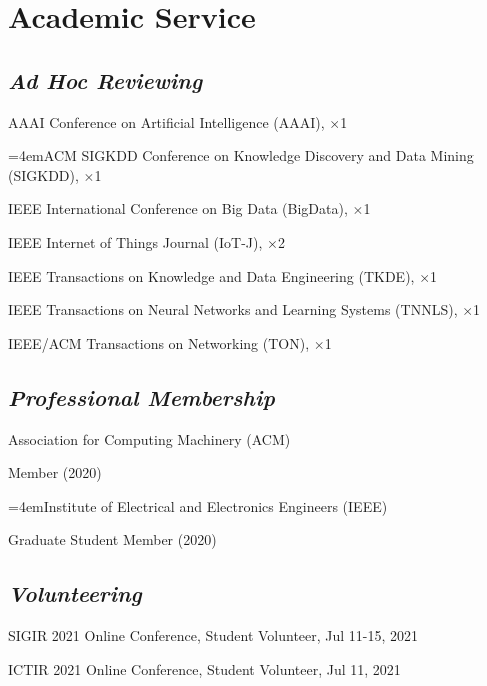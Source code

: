 
\vspace{-8pt}
\section*{Academic Service}
\vspace{-4pt}


\subsection*{\textnormal{\textit{Ad Hoc Reviewing}}}
\vspace{-4pt}
\indent

AAAI Conference on Artificial Intelligence (AAAI), $\times$1

\hangindent=4emACM SIGKDD Conference on Knowledge Discovery and Data Mining (SIGKDD), $\times$1


IEEE International Conference on Big Data (BigData), $\times$1

IEEE Internet of Things Journal (IoT-J), $\times$2

IEEE Transactions on Knowledge and Data Engineering (TKDE), $\times$1

IEEE Transactions on Neural Networks and Learning Systems (TNNLS), $\times$1

IEEE/ACM Transactions on Networking (TON), $\times$1

\subsection*{\textnormal{\textit{Professional Membership}}}
\vspace{-4pt}
\indent 

Association for Computing Machinery (ACM)  

\hspace{2em}Member (2020)

\hangindent=4emInstitute of Electrical and Electronics Engineers (IEEE)

\hspace{2em}Graduate Student Member (2020)



\subsection*{\textnormal{\textit{Volunteering}}}
\vspace{-4pt}
\indent 

SIGIR 2021 Online Conference, Student Volunteer, Jul 11-15, 2021

ICTIR 2021 Online Conference, Student Volunteer, Jul 11, 2021